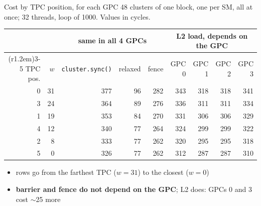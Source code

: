 \documentclass[aspectratio=169, numbering=fraction]{beamer}
\begin{document}
\begin{frame}{Cost by TPC position, for each GPC}
  \footnotesize
  48 clusters of one block, one per SM, all at once; 32 threads, loop of 1000. Values in cycles.

  \vspace{0.4em}
  \centering
  \small
  \setlength{\tabcolsep}{6pt}
  \begin{tabular}{@{}rr@{\hspace{1.8em}}rrr@{\hspace{1.8em}}rrrr@{}}
    \toprule
    & & \multicolumn{3}{c}{\textbf{same in all 4 GPCs}} & \multicolumn{4}{c}{\textbf{L2 load, depends on the GPC}} \\
    \cmidrule(r{1.2em}){3-5}\cmidrule{6-9}
    TPC pos. & $w$ & \texttt{cluster.sync()} & relaxed & fence & GPC 0 & GPC 1 & GPC 2 & GPC 3 \\
    \midrule
      0 & 31 & 377 & 96 & 282 & \textcolor{myred}{343} & 318 & 318 & \textcolor{myred}{341} \\
      3 & 24 & 364 & 89 & 276 & \textcolor{myred}{336} & 311 & 311 & \textcolor{myred}{334} \\
      1 & 19 & 353 & 84 & 270 & \textcolor{myred}{331} & 306 & 306 & \textcolor{myred}{329} \\
      4 & 12 & 340 & 77 & 264 & \textcolor{myred}{324} & 299 & 299 & \textcolor{myred}{322} \\
      2 & 8 & 333 & 77 & 262 & \textcolor{myred}{320} & 295 & 295 & \textcolor{myred}{318} \\
      5 & 0 & 326 & 77 & 262 & \textcolor{myred}{312} & 287 & 287 & \textcolor{myred}{310} \\
    \bottomrule
  \end{tabular}

  \vspace{0.4em}
  \raggedright
  \footnotesize
  \begin{itemize}\itemsep2pt
    \item rows go from the farthest TPC ($w = 31$) to the closest ($w = 0$)
    \item \textbf{barrier and fence do not depend on the GPC}; L2 does: \textcolor{myred}{GPCs 0 and 3} cost $\sim$25 more
  \end{itemize}
\end{frame}
\end{document}
